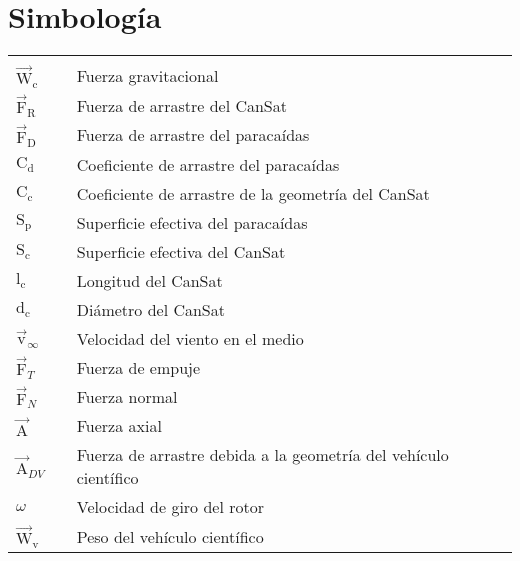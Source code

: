\chapter{Simbolog\'ia}


\begin{table}[H]
\begin{tabular}{p{0.5cm}p{0.5cm}p{13cm}}

\multicolumn{3}{l}{}\tabularnewline
$\overrightarrow{\text{W}}_\text{c}$ & & Fuerza gravitacional\tabularnewline
$\overrightarrow{\text{F}}_\text{R}$ & & Fuerza de arrastre del CanSat\tabularnewline
$\overrightarrow{\text{F}}_\text{D}$ & & Fuerza de arrastre del paraca\'idas\tabularnewline
$\text{C}_\text{d}$ & & Coeficiente de arrastre del paraca\'idas\tabularnewline
$\text{C}_\text{c}$ & & Coeficiente de arrastre de la geometr\'ia del CanSat\tabularnewline
$\text{S}_\text{p}$ & & Superficie efectiva del paraca\'idas\tabularnewline
$\text{S}_\text{c}$ & & Superficie efectiva del CanSat\tabularnewline
$\text{l}_\text{c}$ & & Longitud del CanSat\tabularnewline
$\text{d}_\text{c}$ & & Di\'ametro del CanSat\tabularnewline
$\overrightarrow{\text{v}}_{\infty}$ & & Velocidad del viento en el medio\tabularnewline
$\overrightarrow{\text{F}}_{T}$ & & Fuerza de empuje\tabularnewline
$\overrightarrow{\text{F}}_{N}$ & & Fuerza normal\tabularnewline
$\overrightarrow{\text{A}}$ & & Fuerza axial\tabularnewline
$\overrightarrow{\text{A}}_{DV}$ & & Fuerza de arrastre debida a la geometr\'ia del veh\'iculo cient\'ifico\tabularnewline
$\omega$ & & Velocidad de giro del rotor\tabularnewline
$\overrightarrow{\text{W}}_\text{v}$ & & Peso del veh\'iculo cient\'ifico\tabularnewline


\end{tabular}
\end{table}